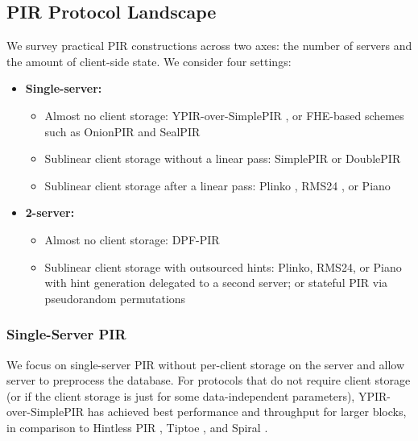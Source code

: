 \subsection{PIR Protocol Landscape}
\label{sec:landscape}

We survey practical PIR constructions across two axes: the number of servers and the amount of client-side state. We consider four settings:
\begin{itemize}[nolistsep,leftmargin=*]
    \item \textbf{Single-server:}
    \smallskip
    \begin{itemize}[nolistsep,leftmargin=*]
        \item Almost no client storage: YPIR-over-SimplePIR \cite{ypir2024}, or FHE-based schemes such as OnionPIR \cite{onionpir21} and SealPIR \cite{sealpir18}

        \item Sublinear client storage without a linear pass: SimplePIR or DoublePIR \cite{henz23}

        \item Sublinear client storage after a linear pass: Plinko \cite{plinko2024}, RMS24 \cite{rms24}, or Piano \cite{piano2024}
    \end{itemize}

    \smallskip
    \item \textbf{2-server:}
    \smallskip
    \begin{itemize}[nolistsep,leftmargin=*]
        \item Almost no client storage: DPF-PIR \cite{gilboa2014dpf,boyle2015fss,boyle2016fss}

        \item Sublinear client storage with outsourced hints: Plinko, RMS24, or Piano with hint generation delegated to a second server; or stateful PIR via pseudorandom permutations \cite{ar26fpe,checklist21}
    \end{itemize}
\end{itemize}

\subsubsection{Single-Server PIR}

We focus on single-server PIR without per-client storage on the server and allow server to preprocess the database. For protocols that do not require client storage (or if the client storage is just for some data-independent parameters), YPIR-over-SimplePIR has achieved best performance and throughput for larger blocks, in comparison to Hintless PIR \cite{li24}, Tiptoe \cite{tiptoe23}, and Spiral \cite{spiral22}.

